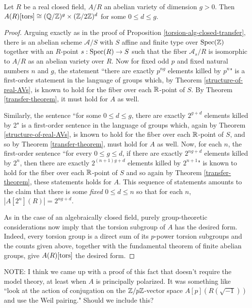 \begin{proposition}
\label{torsion-prop-real-closed}
Let $R$ be a real closed field, $A/R$ an abelian variety of dimension $g>0$. Then $A(R)[\operatorname{tors}]\cong (\mathbb{Q}/\mathbb{Z})^g\times (\mathbb{Z}/2\mathbb{Z})^d$ for some $0\leq d\leq g$.
\end{proposition}
\begin{proof}
Arguing exactly as in the proof of Proposition \ref{torsion-alg-closed-transfer}, there is an abelian scheme $\mathcal{A}/S$ with $S$ affine and finite type over $\operatorname{Spec}(\mathbb{Z})$ together with an $R$-point $s:\operatorname{Spec}(R)\rightarrow S$ such that the fiber $\mathcal{A}_s/R$ is isomorphic to $A/R$ as an abelian variety over $R$. Now for fixed odd $p$ and fixed natural numbers $n$ and $g$, the statement ``there are exactly $p^{ng}$ elements killed by $p^n$" is a first-order statement in the language of groups which, by Theorem \ref{structure-of-real-AVs}, is known to hold for the fiber over each $\mathbb{R}$-point of $S$. By Theorem \ref{transfer-theorem}, it must hold for $A$ as well. 

Similarly, the sentence ``for some $0\leq d\leq g$, there are exactly $2^{g+d}$ elements killed by 2" is a first-order sentence in the language of groups which, again by Theorem \ref{structure-of-real-AVs}, is known to hold for the fiber over each $\mathbb{R}$-point of $S$, and so by Theorem \ref{transfer-theorem}, must hold for $A$ as well. Now, for each $n$, the first-order sentence ``for every $0\leq g\leq d$, if there are exactly $2^{ng+d}$ elements killed by $2^n$, then there are exactly $2^{(n+1)g+d}$ elements killed by $2^{n+1}$" is known to hold for the fiber over each $\mathbb{R}$-point of $S$ and so again by Theorem \ref{transfer-theorem}, these statements holds for $A$. This sequence of statements amounts to the claim that there is some \emph{fixed} $0\leq d \leq n$ so that for each $n$, $|A[2^n](R)|=2^{ng+d}$.

As in the case of an algebraically closed field, purely group-theoretic considerations now imply that the torsion subgroup of $A$ has the desired form. Indeed, every torsion group is a direct sum of its $p$-power torsion subgroups and the counts given above, together with the fundamental theorem of finite abelian groups, give $A(R)[\operatorname{tors}]$ the desired form.
\end{proof}

NOTE: I think we came up with a proof of this fact that doesn't require the model theory, at least when $A$ is principally polarized. It was something like ``look at the action of conjugation on the $\mathbb{Z}/p\mathbb{Z}$-vector space $A[p](R(\sqrt{-1}))$ and use the Weil pairing." Should we include this?

